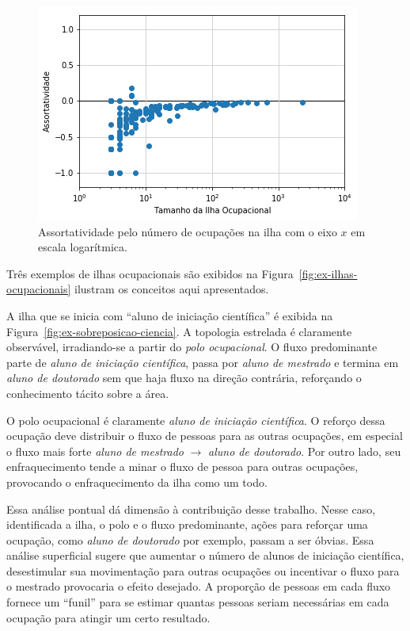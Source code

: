 \documentclass[
  article,
  11pt,
  a4paper,
  english,
  brazil,
  sumario=tradicional]{abntex2}
\begin{document}
\begin{figure}[htb]
    \centering
    \includegraphics[width=0.9\linewidth]{assortatividade.png}
    \caption{Assortatividade pelo número de ocupações na ilha com o eixo $x$ em escala logarítmica.}
    \label{fig:assortatividade}
\end{figure}


Três exemplos de ilhas ocupacionais são exibidos na Figura~\ref{fig:ex-ilhas-ocupacionais} ilustram os conceitos aqui apresentados.

A ilha que se inicia com \enquote{aluno de iniciação científica} é exibida na Figura~\ref{fig:ex-sobreposicao-ciencia}. A topologia estrelada é claramente observável, irradiando-se a partir do \textit{polo ocupacional}. O fluxo predominante parte de \textit{aluno de iniciação científica}, passa por \textit{aluno de mestrado} e termina em \textit{aluno de doutorado} sem que haja fluxo na direção contrária, reforçando o conhecimento tácito sobre a área.

O polo ocupacional é claramente \textit{aluno de iniciação científica}. O reforço dessa ocupação deve distribuir o fluxo de pessoas para as outras ocupações, em especial o fluxo mais forte \textit{aluno de mestrado} $\rightarrow$ \textit{aluno de doutorado}. Por outro lado, seu enfraquecimento tende a minar o fluxo de pessoa para outras ocupações, provocando o enfraquecimento da ilha como um todo.

Essa análise pontual dá dimensão à contribuição desse trabalho. Nesse caso, identificada a ilha, o polo e o fluxo predominante,  ações para reforçar uma ocupação, como \textit{aluno de doutorado} por exemplo, passam a ser óbvias. Essa análise superficial sugere que aumentar o número de alunos de iniciação científica, desestimular sua movimentação para outras ocupações ou incentivar o fluxo para o mestrado provocaria o efeito desejado. A proporção de pessoas em cada fluxo fornece um \enquote{funil} para se estimar quantas pessoas seriam necessárias em cada ocupação para atingir um certo resultado.
\end{document}
